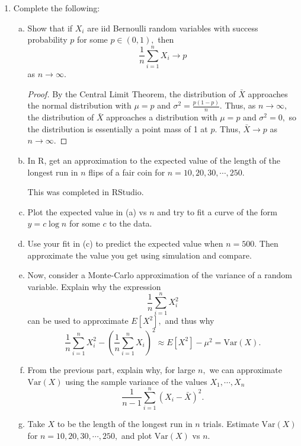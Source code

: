 \documentclass{article}
\newcommand{\var}{\mathrm{Var}}
\begin{document}
\begin{enumerate}
	\item Complete the following:
		\begin{enumerate}[(a)]
			\item Show that if $X_i$ are iid Bernoulli random variables with success probability $p$ for some $p\in(0, 1),$ then \[\frac{1}{n}\sum_{i=1}^n X_i\to p\] as $n\to\infty.$
				\begin{proof}
					By the Central Limit Theorem, the distribution of $\bar{X}$ approaches the normal distribution with $\mu=p$ and $\sigma^2=\frac{p(1-p)}{n}.$ Thus, as $n\to\infty,$ the distribution of $\bar{X}$ approaches a distribution with $\mu=p$ and $\sigma^2=0,$ so the distribution is essentially a point mass of 1 at $p.$ Thus, $\bar{X}\to p$ as $n\to\infty.$
					
				\end{proof}

			\item In R, get an approximation to the expected value of the length of the longest run in $n$ flips of a fair coin for $n=10, 20, 30, \cdots, 250.$
				\begin{answer*}
					This was completed in RStudio. 
				\end{answer*}

			\item Plot the expected value in (a) vs $n$ and try to fit a curve of the form $y=c\log n$ for some $c$ to the data.

			\item Use your fit in (c) to predict the expected value when $n=500.$ Then approximate the value you get using simulation and compare.
				
			\item Now, consider a Monte-Carlo approximation of the variance of a random variable. Explain why the expression \[\frac{1}{n}\sum_{i=1}^n X_i^2\] can be used to approximate $E[X^2],$ and thus why \[\frac{1}{n}\sum_{i=1}^n X_i^2 - \left( \frac{1}{n}\sum_{i=1}^n X_i \right)^2 \approx E[X^2]-\mu^2=\var(X).\]

			\item From the previous part, explain why, for large $n,$ we can approximate $\var(X)$ using the sample variance of the values $X_1, \cdots, X_n$ \[\frac{1}{n-1}\sum_{i=1}^n (X_i-\bar{X})^2.\]

			\item Take $X$ to be the length of the longest run in $n$ trials. Estimate $\var(X)$ for $n=10, 20, 30, \cdots, 250,$ and plot $\var(X)$ vs $n.$
				

\end{enumerate}
\end{enumerate}
\end{document}
